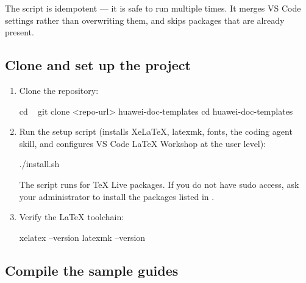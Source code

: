 \documentclass{guide}
\begin{document}
\begin{infobox}
The  script is idempotent --- it is safe to run multiple
times. It merges VS Code settings rather than overwriting them, and
 skips packages that are already present.
\end{infobox}

\subsection{Clone and set up the project}

\stepbystep
\begin{enumerate}
  \item Clone the repository:

  \begin{code}[bash]
cd ~
git clone <repo-url> huawei-doc-templates
cd huawei-doc-templates
  \end{code}

  \item Run the setup script (installs XeLaTeX, latexmk, fonts, the coding
        agent skill, and configures VS Code LaTeX Workshop at the user
        level):

  \begin{code}[bash]
./install.sh
  \end{code}

  \begin{warning}
  The script runs  for TeX Live packages. If you
  do not have sudo access, ask your administrator to install the packages
  listed in .
  \end{warning}

  \item Verify the LaTeX toolchain:

  \begin{code}[bash]
xelatex --version
latexmk --version
  \end{code}
\end{enumerate}

\subsection{Compile the sample guides}
\end{document}
